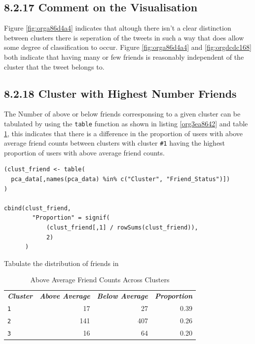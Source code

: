 \documentclass[11pt]{article}
\begin{document}
\subsection{8.2.17 Comment on the Visualisation}
\label{sec:org21ec367}
Figure \ref{fig:orga86d4a4} indicates that altough there isn't a clear distinction between
clusters there is seperation of the tweets in such a way that does allow some
degree of classification to occur. Figure \ref{fig:orga86d4a4} and \ref{fig:orgdcdc168} both indicate that having
many or few friends is reasonably independent of the cluster that the tweet
belongs to.
\subsection{8.2.18 Cluster with Highest Number Friends}
\label{sec:org9821a69}
The Number of above or below friends corresponsing to a given cluster can be tabulated by using the \texttt{table} function as shown in listing \ref{org3ea8642} and table \ref{tab:org5d15cd2}, this indicates that there is a difference in the proportion of users with above average friend counts between clusters with cluster \texttt{\#1} having the highest proportion of users with above average friend counts.

\begin{listing}[htbp]
\begin{verbatim}
(clust_friend <- table(
  pca_data[,names(pca_data) %in% c("Cluster", "Friend_Status")])
)

cbind(clust_friend,
        "Proportion" = signif(
            (clust_friend[,1] / rowSums(clust_friend)),
            2)
      )
\end{verbatim}
\caption{\label{org3ea8642}Tabulate the distribution of friends in}
\end{listing}

\begin{table}[htbp]
\caption{\label{tab:org5d15cd2}Above Average Friend Counts Across Clusters}
\centering
\begin{tabular}{lrrr}
\textbf{\emph{Cluster}} & \textbf{\emph{Above Average}} & \textbf{\emph{Below Average}} & \textbf{\emph{Proportion}}\\
\texttt{1} & 17 & 27 & 0.39\\
\texttt{2} & 141 & 407 & 0.26\\
\texttt{3} & 16 & 64 & 0.20\\
\end{tabular}
\end{table}
\end{document}
